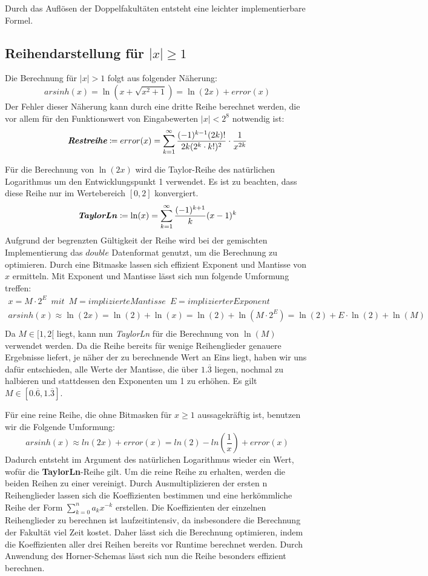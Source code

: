 \documentclass[course=erap] {aspdoc}
\begin{document}
    Durch das Auflösen der Doppelfakultäten entsteht eine leichter implementierbare Formel.

    \subsection{Reihendarstellung für $|x|\geq 1$}
    Die Berechnung für $|x| > 1$ folgt aus folgender Näherung:
    \[
        arsinh(x) = \ln(x + \sqrt{x^2 + 1}) = \ln(2x) + error(x)
    \]
    Der Fehler dieser Näherung kann durch eine dritte Reihe berechnet werden, die vor allem für den Funktionswert von Eingabewerten $|x| < 2^{8}$ notwendig ist:
    \[
        \textit{\textbf{Restreihe}}\coloneqq error(x) =  \sum_{k = 1}^{\infty} \frac{(-1)^{k - 1}(2k)!}{2k(2^k\cdot k!)^2} \cdot \frac{1}{x^{2k}}
    \]

    Für die Berechnung von $\ln(2x)$ wird die Taylor-Reihe des natürlichen Logarithmus um den Entwicklungspunkt 1 verwendet.
    Es ist zu beachten, dass diese Reihe nur im Wertebereich $[0, 2]$ konvergiert.
    \[
        \textbf{\textit{TaylorLn}}\coloneqq\ln(x) = \sum_{k = 1}^{\infty} \frac{(-1)^{k + 1}}{k}(x - 1)^k
    \]
    Aufgrund der begrenzten Gültigkeit der Reihe wird bei der gemischten Implementierung das $double$ Datenformat genutzt, um die Berechnung zu optimieren.
    Durch eine Bitmaske lassen sich effizient Exponent und Mantisse von $x$ ermitteln.
    Mit Exponent und Mantisse lässt sich nun folgende Umformung treffen:
    \begin{gather*}
        x = M\cdot2^E \,\,\, mit \,\,\, M = implizierte Mantisse \,\,\, E = implizierter Exponent\\
        arsinh(x) \approx \ln(2x) = \ln(2) + \ln(x) = \ln(2) + \ln(M\cdot2^E) = \ln(2) + E\cdot\ln(2) + \ln(M)\\
    \end{gather*}
    Da $M\in[1, 2[$ liegt, kann nun \textit{TaylorLn} für die Berechnung von $\ln(M)$ verwendet werden.
    Da die Reihe bereits für wenige Reihenglieder genauere Ergebnisse liefert, je näher der zu berechnende Wert an Eins liegt, haben wir uns dafür entschieden, alle Werte der Mantisse, die über $1.\overline{3}$ liegen, nochmal zu halbieren und stattdessen den Exponenten um 1 zu erhöhen.
    Es gilt $M\in[0.\overline{6}, 1.\overline{3}]$.

    Für eine reine Reihe, die ohne Bitmasken für $x\geq 1$ aussagekräftig ist, benutzen wir die Folgende Umformung:
    \[
        arsinh(x)\approx ln(2x) + error(x) = ln(2) - ln(\frac{1}{x}) + error(x)
    \]
    Dadurch entsteht im Argument des natürlichen Logarithmus wieder ein Wert, wofür die \textbf{TaylorLn}-Reihe gilt.
    Um die reine Reihe zu erhalten, werden die beiden Reihen zu einer vereinigt.
    Durch Ausmultiplizieren der ersten n Reihenglieder lassen sich die Koeffizienten bestimmen und eine herkömmliche Reihe der Form $\sum_{k=0}^{n} a_k x^{-k}$ erstellen.
    Die Koeffizienten der einzelnen Reihenglieder zu berechnen ist laufzeitintensiv, da insbesondere die Berechnung der Fakultät viel Zeit kostet.
    Daher lässt sich die Berechnung optimieren, indem die Koeffizienten aller drei Reihen bereits vor Runtime berechnet werden.
    Durch Anwendung des Horner-Schemas lässt sich nun die Reihe besonders effizient berechnen.
\end{document}

